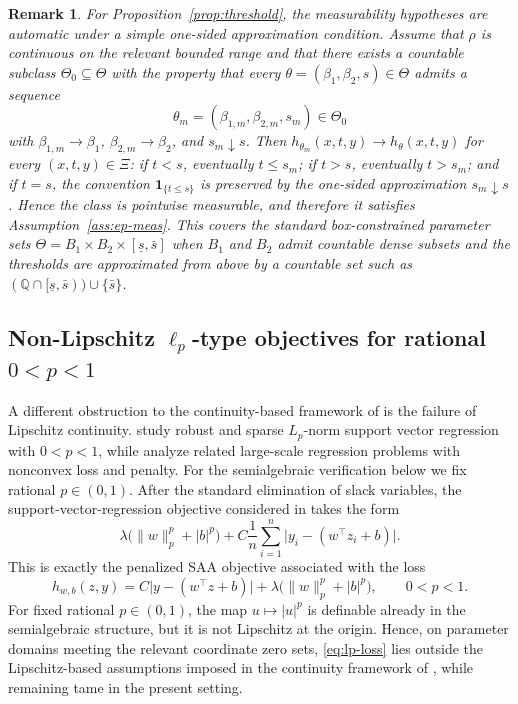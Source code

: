 \documentclass[11pt]{article}
\newtheorem{remark}[theorem]{Remark}
\begin{document}
\begin{remark}
For Proposition~\ref{prop:threshold}, the measurability hypotheses
are automatic under a simple one-sided approximation condition. Assume
that $\rho$ is continuous on the relevant bounded range and that there
exists a countable subclass $\Theta_{0}\subseteq\Theta$ with the property
that every $\theta=(\beta_{1},\beta_{2},s)\in\Theta$ admits a sequence
\[
\theta_{m}=(\beta_{1,m},\beta_{2,m},s_{m})\in\Theta_{0}
\]
with $\beta_{1,m}\to\beta_{1}$, $\beta_{2,m}\to\beta_{2}$, and $s_{m}\downarrow s$.
Then $h_{\theta_{m}}(x,t,y)\to h_{\theta}(x,t,y)$ for every $(x,t,y)\in\Xi$:
if $t<s$, eventually $t\le s_{m}$; if $t>s$, eventually $t>s_{m}$;
and if $t=s$, the convention $\mathbf{1}_{\{t\le s\}}$ is preserved
by the one-sided approximation $s_{m}\downarrow s$. Hence the class
is pointwise measurable, and therefore it satisfies Assumption~\ref{ass:ep-meas}. This covers
the standard box-constrained parameter sets $\Theta=B_{1}\times B_{2}\times[\underline{s},\bar{s}]$
when $B_{1}$ and $B_{2}$ admit countable dense subsets and the thresholds
are approximated from above by a countable set such as $(\mathbb{Q}\cap[\underline{s},\bar{s}))\cup\{\bar{s}\}$.
\end{remark}

\subsection{\texorpdfstring{Non-Lipschitz $\ell_{p}$-type objectives for rational
$0<p<1$}{Non-Lipschitz lp-type objectives for rational 0<p<1}}

A different obstruction to the continuity-based framework of \citet{Banholzer2022}
is the failure of Lipschitz continuity. \citet{YeYingShaoLiChen2017}
study robust and sparse $L_{p}$-norm support vector regression with
$0<p<1$, while \citet{BucciniEtAl2020} analyze related large-scale
regression problems with nonconvex loss and penalty. For the semialgebraic
verification below we fix rational $p\in(0,1)$. After the standard
elimination of slack variables, the support-vector-regression objective
considered in \citet{YeYingShaoLiChen2017} takes the form 
\[
\lambda\bigl(\lVert w\rVert_{p}^{p}+|b|^{p}\bigr)+C\frac{1}{n}\sum_{i=1}^{n}\bigl|y_{i}-(w^{\top}z_{i}+b)\bigr|.
\]
This is exactly the penalized SAA objective associated with the loss
\begin{equation}
h_{w,b}(z,y)=C\lvert y-(w^{\top}z+b)\rvert+\lambda\bigl(\lVert w\rVert_{p}^{p}+|b|^{p}\bigr),\qquad0<p<1.\label{eq:lp-loss}
\end{equation}
For fixed rational $p\in(0,1)$, the map $u\mapsto|u|^{p}$ is definable
already in the semialgebraic structure, but it is not Lipschitz at
the origin. Hence, on parameter domains meeting the relevant coordinate
zero sets, \eqref{eq:lp-loss} lies outside the Lipschitz-based assumptions
imposed in the continuity framework of \citet{Banholzer2022}, while
remaining tame in the present setting.
\end{document}
